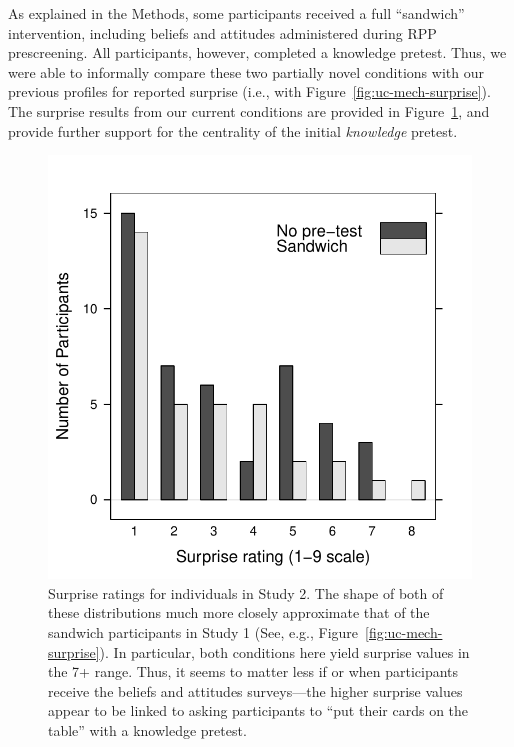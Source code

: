 As explained in the Methods, some participants received a full “sandwich”
intervention, including beliefs and attitudes administered during RPP
prescreening. All participants, however, completed a knowledge pretest. Thus,
we were able to informally compare these two partially novel conditions with our
previous profiles for reported surprise (i.e., with
Figure~\ref{fig:uc-mech-surprise}). The surprise results from our current
conditions are provided in Figure~\ref{fig:rpp-mech-surprise}, and provide
further support for the centrality of the initial \emph{knowledge} pretest.

\begin{figure}
    \centering
    \includegraphics{RPP-mech-surprise-by-group.pdf}
    \caption{Surprise ratings for individuals in Study 2. The shape of both of
        these distributions much more closely approximate that of the sandwich
        participants in Study 1 (See, e.g., Figure~\ref{fig:uc-mech-surprise}).
        In particular, both conditions here yield surprise values in the 7+
        range.  Thus, it seems to matter less if or when participants receive
        the beliefs and attitudes surveys---the higher surprise values appear
        to be linked to asking participants to “put their cards on the table”
        with a knowledge pretest.}
    \label{fig:rpp-mech-surprise}
\end{figure}

